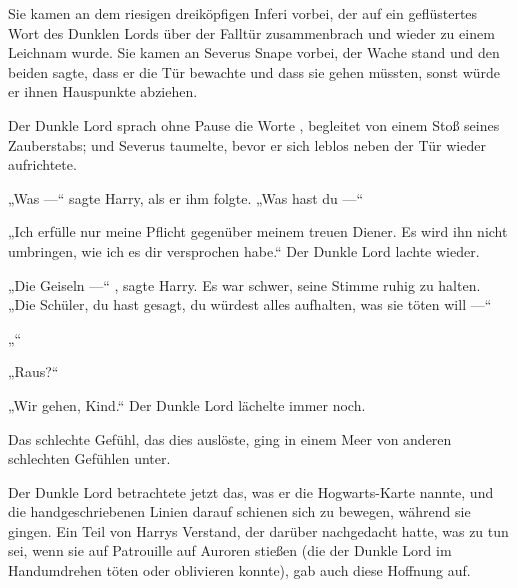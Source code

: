 Sie kamen an dem riesigen dreiköpfigen Inferi vorbei, der auf ein geflüstertes Wort des Dunklen Lords über der Falltür zusammenbrach und wieder zu einem Leichnam wurde.
Sie kamen an Severus Snape vorbei, der Wache stand und den beiden sagte, dass er die Tür bewachte und dass sie gehen müssten, sonst würde er ihnen Hauspunkte abziehen.

Der Dunkle Lord sprach ohne Pause die Worte , begleitet von einem Stoß seines Zauberstabs; und Severus taumelte, bevor er sich leblos neben der Tür wieder aufrichtete.

„Was —“ sagte Harry, als er ihm folgte.
„Was hast du —“

„Ich erfülle nur meine Pflicht gegenüber meinem treuen Diener. Es wird ihn nicht umbringen, wie ich es dir versprochen habe.“
Der Dunkle Lord lachte wieder.

„Die Geiseln —“ , sagte Harry.
Es war schwer, seine Stimme ruhig zu halten.
„Die Schüler, du hast gesagt, du würdest alles aufhalten, was sie töten will —“

„“

„Raus?“

„Wir gehen, Kind.“ Der Dunkle Lord lächelte immer noch.

Das schlechte Gefühl, das dies auslöste, ging in einem Meer von anderen schlechten Gefühlen unter.

Der Dunkle Lord betrachtete jetzt das, was er die Hogwarts-Karte nannte, und die handgeschriebenen Linien darauf schienen sich zu bewegen, während sie gingen. Ein Teil von Harrys Verstand, der darüber nachgedacht hatte, was zu tun sei, wenn sie auf Patrouille auf Auroren stießen (die der Dunkle Lord im Handumdrehen töten oder oblivieren konnte), gab auch diese Hoffnung auf.

